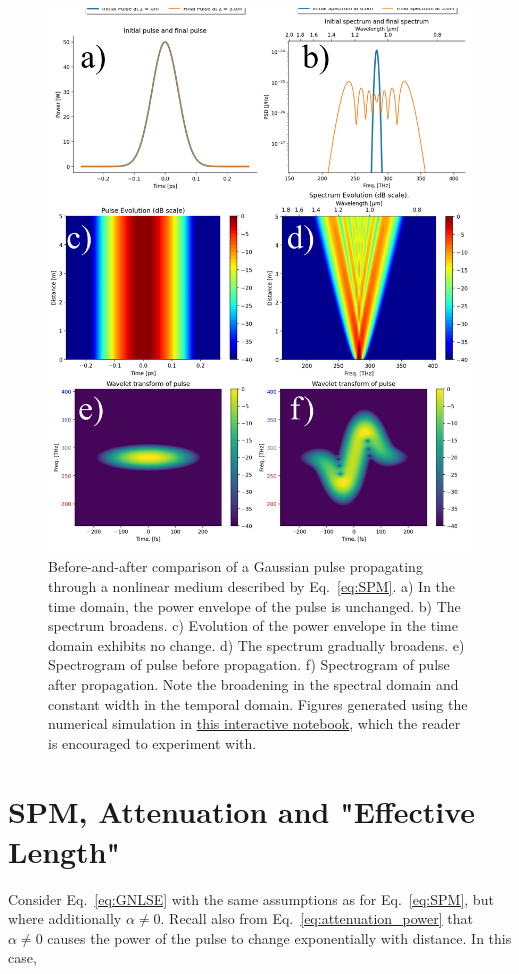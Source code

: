 \begin{figure}
    \centering
    \includegraphics[width=1\linewidth]{figures/SPM_combined.png}
    \caption{ Before-and-after comparison of a Gaussian pulse propagating through a nonlinear medium described by Eq.~\ref{eq:SPM}. 
    a) In the time domain, the power envelope of the pulse is unchanged. b) The spectrum broadens. c) Evolution of the power envelope in the time domain exhibits no change. d) The spectrum gradually broadens. e) Spectrogram of pulse before propagation. f) Spectrogram of pulse after propagation. Note the broadening in the spectral domain and constant width in the temporal domain. Figures generated using the numerical simulation in \href{https://colab.research.google.com/drive/1P41F4hO6Mv12RsEkpogYv5teQyFZ6iW0?usp=sharing}{this interactive notebook}, which the reader is encouraged to experiment with.}
    \label{fig:SPM_before_and_after}
\end{figure}

 


\section{SPM, Attenuation and "Effective Length"}
Consider Eq.~\ref{eq:GNLSE} with the same assumptions as for Eq.~\ref{eq:SPM}, but where additionally $\alpha\neq0$. Recall also from Eq.~\ref{eq:attenuation_power} that $\alpha\neq0$ causes the power of the pulse to change exponentially with distance. In this case,

